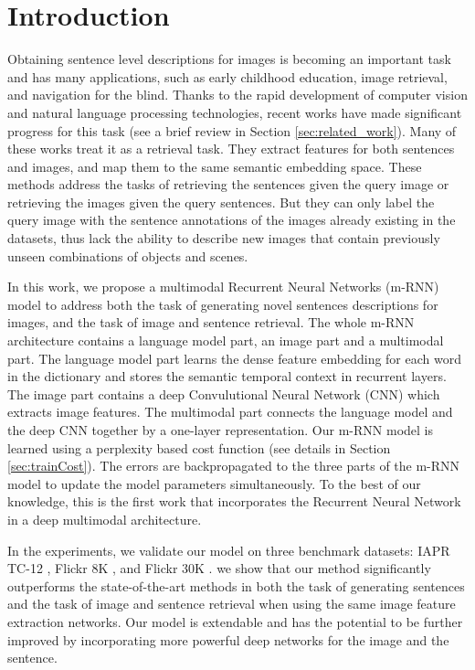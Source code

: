 
\section{Introduction}

Obtaining sentence level descriptions for images is becoming an important task and has many applications, such as early childhood education, image retrieval, and navigation for the blind.
Thanks to the rapid development of computer vision and natural language processing technologies, recent works have made significant progress for this task (see a brief review in Section \ref{sec:related_work}).
Many of these works treat it as a retrieval task.
They extract features for both sentences and images, and map them to the same semantic embedding space.
These methods address the tasks of retrieving the sentences given the query image or retrieving the images given the query sentences.
But they can only label the query image with the sentence annotations of the images already existing in the datasets, thus lack the ability to describe new images that contain previously unseen combinations of objects and scenes.

In this work, we propose a multimodal Recurrent Neural Networks (m-RNN) model to address both the task of generating novel sentences descriptions for images, and the task of image and sentence retrieval.
The whole m-RNN architecture contains a language model part, an image part and a multimodal part.
The language model part learns the dense feature embedding for each word in the dictionary and stores the semantic temporal context in recurrent layers.
The image part contains a deep Convulutional Neural Network (CNN) \cite{krizhevsky2012imagenet} which extracts image features.
The multimodal part connects the language model and the deep CNN together by a one-layer representation.
Our m-RNN model is learned using a perplexity based cost function (see details in Section \ref{sec:trainCost}).
The errors are backpropagated to the three parts of the m-RNN model to update the model parameters simultaneously.
To the best of our knowledge, this is the first work that incorporates the Recurrent Neural Network in a deep multimodal architecture.

In the experiments, we validate our model on three benchmark datasets: IAPR TC-12 \cite{grubinger2006iapr}, Flickr 8K \cite{rashtchian2010collecting}, and Flickr 30K \cite{hodoshimage}.
we show that our method significantly outperforms the state-of-the-art methods in both the task of generating sentences and the task of image and sentence retrieval when using the same image feature extraction networks.
Our model is extendable and has the potential to be further improved by incorporating more powerful deep networks for the image and the sentence.